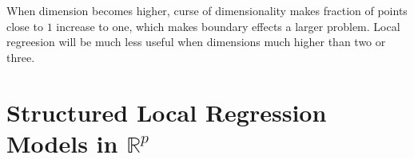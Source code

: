 When dimension becomes higher, curse of dimensionality makes fraction of points close to $1$
increase to one, which makes boundary effects a larger problem. Local regreesion will be much 
less useful when dimensions much higher than two or three. 

\section{Structured Local Regression Models in $\mathbb{R}^p$}
